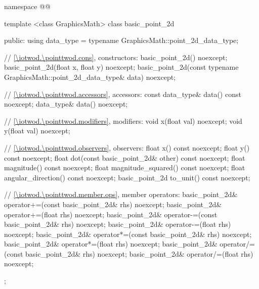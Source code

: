 \begin{codeblock}
namespace @\fullnamespace{}@ {
  template <class GraphicsMath>
  class basic_point_2d {
  public:
    using data_type = typename GraphicsMath::point_2d_data_type;

    // \ref{\iotwod.\pointtwod.cons}, constructors:
    basic_point_2d() noexcept;
    basic_point_2d(float x, float y) noexcept;
    basic_point_2d(const typename GraphicsMath::point_2d_data_type& data) noexcept;

    // \ref{\iotwod.\pointtwod.accessors}, accessors:
    const data_type& data() const noexcept;
    data_type& data() noexcept;
    
    // \ref{\iotwod.\pointtwod.modifiers}, modifiers:
    void x(float val) noexcept;
    void y(float val) noexcept;

    // \ref{\iotwod.\pointtwod.observers}, observers:
    float x() const noexcept;
    float y() const noexcept;
    float dot(const basic_point_2d& other) const noexcept;
    float magnitude() const noexcept;
    float magnitude_squared() const noexcept;
    float angular_direction() const noexcept;
    basic_point_2d to_unit() const noexcept;

    // \ref{\iotwod.\pointtwod.member.ops}, member operators:
    basic_point_2d& operator+=(const basic_point_2d& rhs) noexcept;
    basic_point_2d& operator+=(float rhs) noexcept;
    basic_point_2d& operator-=(const basic_point_2d& rhs) noexcept;
    basic_point_2d& operator-=(float rhs) noexcept;
    basic_point_2d& operator*=(const basic_point_2d& rhs) noexcept;
    basic_point_2d& operator*=(float rhs) noexcept;
    basic_point_2d& operator/=(const basic_point_2d& rhs) noexcept;
    basic_point_2d& operator/=(float rhs) noexcept;
  };

}
\end{codeblock}
